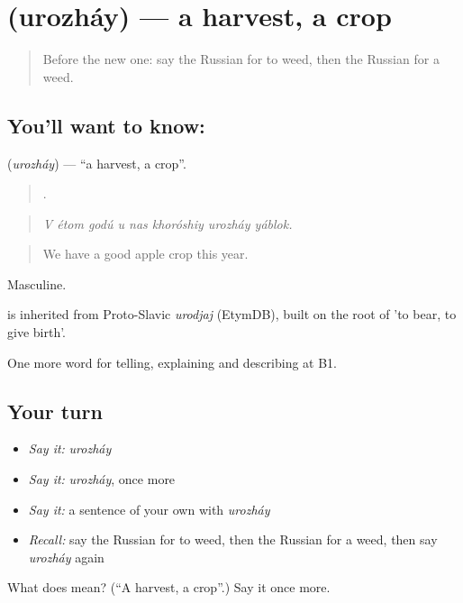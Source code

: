 \section[\texorpdfstring{\ru{урожай} (urozháy)}{урожай (urozháy)}]{ (urozháy) — a harvest, a crop}

\label{lesson:RU-C506-urozhay}



\begin{quote}
Before the new one: say the Russian for to weed, then the Russian for a weed.
\end{quote}

\subsection*{You'll want to know: }
\textbf{} (\emph{urozháy}) — \textquotedblleft{}a harvest, a crop\textquotedblright{}.

\begin{quote}
       .
\end{quote}

\begin{quote}
\emph{V étom godú u nas khoróshiy urozháy yáblok.}
\end{quote}

\begin{quote}
We have a good apple crop this year.
\end{quote}

Masculine.

\begin{cousinweb}
\emph{} is inherited from Proto-Slavic \emph{urodjaj} (EtymDB), built on the root of \emph{} 'to bear, to give birth'.
\end{cousinweb}

\begin{grammarlens}[title={What you've built}]
One more word for telling, explaining and describing at B1.
\end{grammarlens}

\subsection*{Your turn}
\begin{itemize}
\raggedright
  \item \emph{Say it:} \emph{urozháy}
  \item \emph{Say it:} \emph{urozháy}, once more
  \item \emph{Say it:} a sentence of your own with \emph{urozháy}
  \item \emph{Recall:} say the Russian for to weed, then the Russian for a weed, then say \emph{urozháy} again
\end{itemize}

\begin{tcolorbox}[breakable,colback=teal!4,colframe=teal!35!black,title={Before you move on}]
What does  mean? (\textquotedblleft{}A harvest, a crop\textquotedblright{}.) Say it once more.
\end{tcolorbox}
